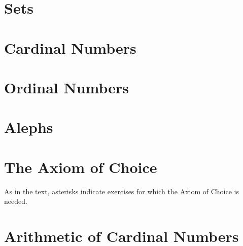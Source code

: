 \begin{questions}

\setcounter{section}{1-1}

\section{Sets}
\setcounter{subsection}{3-1}


\setcounter{section}{5-1}

\section{Cardinal Numbers}



\section{Ordinal Numbers}







\section{Alephs}



\section{The Axiom of Choice}
As in the text, asterisks indicate exercises for which the Axiom of Choice is needed.



\section{Arithmetic of Cardinal Numbers}


\end{questions}

